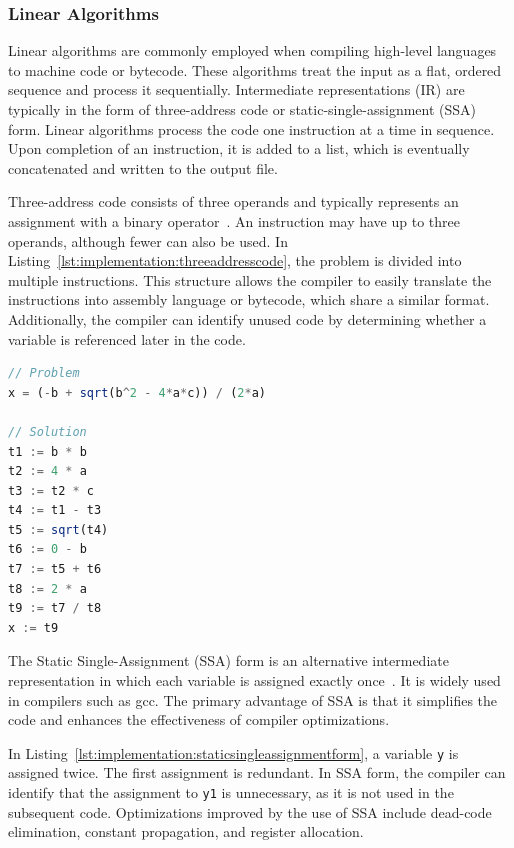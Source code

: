\subsubsection{Linear Algorithms}

Linear algorithms are commonly employed when compiling high-level languages to machine code or bytecode. These algorithms treat the input as a flat, ordered sequence and process it sequentially. Intermediate representations (IR) are typically in the form of three-address code or static-single-assignment (SSA) form. Linear algorithms process the code one instruction at a time in sequence. Upon completion of an instruction, it is added to a list, which is eventually concatenated and written to the output file.

Three-address code consists of three operands and typically represents an assignment with a binary operator~\cite{wiki:threeaddress}. An instruction may have up to three operands, although fewer can also be used. In Listing~\ref{lst:implementation:threeaddresscode}, the problem is divided into multiple instructions. This structure allows the compiler to easily translate the instructions into assembly language or bytecode, which share a similar format. Additionally, the compiler can identify unused code by determining whether a variable is referenced later in the code.

\begin{lstlisting}[language=TypeScript,caption=Three-address code,label=lst:implementation:threeaddresscode]
// Problem
x = (-b + sqrt(b^2 - 4*a*c)) / (2*a)

// Solution
t1 := b * b
t2 := 4 * a
t3 := t2 * c
t4 := t1 - t3
t5 := sqrt(t4)
t6 := 0 - b
t7 := t5 + t6
t8 := 2 * a
t9 := t7 / t8
x := t9
\end{lstlisting}

The Static Single-Assignment (SSA) form is an alternative intermediate representation in which each variable is assigned exactly once~\cite{wiki:singlestatic}. It is widely used in compilers such as \acrshort{gcc}. The primary advantage of SSA is that it simplifies the code and enhances the effectiveness of compiler optimizations.

In Listing~\ref{lst:implementation:staticsingleassignmentform}, a variable \lstinline|y| is assigned twice. The first assignment is redundant. In SSA form, the compiler can identify that the assignment to \lstinline|y1| is unnecessary, as it is not used in the subsequent code. Optimizations improved by the use of SSA include dead-code elimination, constant propagation, and register allocation.

